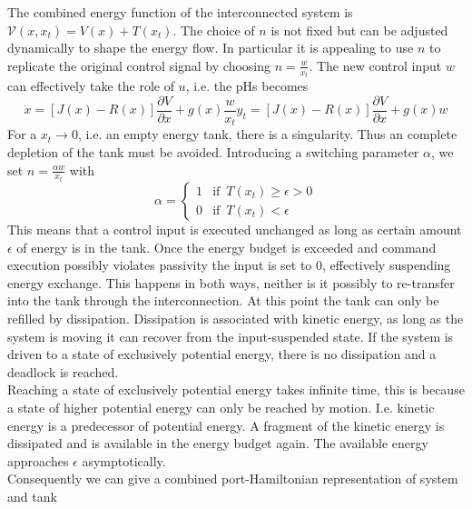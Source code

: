 \documentclass[a4paper,twoside, openright,12pt]{report}
\begin{document}
The combined energy function of the interconnected system is $\mathcal{V}(x,x_t)=V(x)+T(x_t)$. The choice of $n$ is not fixed but can be adjusted dynamically to shape the energy flow. In particular it is appealing to use $n$ to replicate the original control signal by choosing $n = \frac{w}{x_t}$. The new control input $w$ can effectively take the role of $u$, i.e. the pHs becomes
\begin{equation}
\dot{x} = [J(x) - R(x)] \frac{\partial V}{\partial x} + g(x)\frac{w}{x_t}y_t = [J(x) - R(x)] \frac{\partial V}{\partial x} + g(x)w
\end{equation}
For a $x_t\rightarrow0$, i.e. an empty energy tank, there is a singularity. Thus an complete depletion of the tank must be avoided. Introducing a switching parameter $\alpha$, we set $n=\frac{\alpha w}{x_t}$ with 
\begin{equation}
\alpha = \begin{cases}
1 & \text{if } \, T(x_t)\geq\epsilon>0 \\
0 & \text{if } \, T(x_t) < \epsilon
\end{cases}
\end{equation}
This means that a control input is executed unchanged as long as certain amount $\epsilon$ of energy is in the tank. Once the energy budget is exceeded and command execution possibly violates passivity the input is set to $0$, effectively suspending energy exchange. This happens in both ways, neither is it possibly to re-transfer into the tank through the interconnection. At this point the tank can only be refilled by dissipation. Dissipation is associated with kinetic energy, as long as the system is moving it can recover from the input-suspended state. If the system is driven to a state of exclusively potential energy, there is no dissipation and a deadlock is reached.\\
Reaching a state of exclusively potential energy takes infinite time, this is because a state of higher potential energy can only be reached by motion. I.e. kinetic energy is a predecessor of potential energy. A fragment of the kinetic energy is dissipated and is available in the energy budget again. The available energy approaches $\epsilon$ asymptotically.\\
Consequently we can give a combined port-Hamiltonian representation of system and tank
\end{document}
